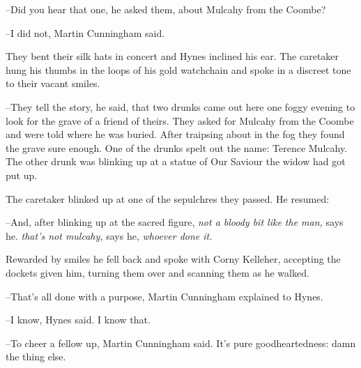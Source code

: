 --Did you hear that one,
he asked them,
about Mulcahy from the Coombe?

--I did not,
Martin Cunningham said.

They bent their silk hats in concert and Hynes inclined his ear.
The caretaker hung his thumbs in the loops of his gold watchchain
and spoke in a discreet tone to their vacant smiles.

--They tell the story,
he said,
that two drunks came out here one foggy
evening to look for the grave of a friend of theirs.
They asked for Mulcahy from the Coombe and were told where he was buried.
After traipsing about in the fog they found the grave sure enough.
One of the drunks spelt out the name:
Terence Mulcahy.
The other drunk was blinking up at a statue of Our Saviour
the widow had got put up.

The caretaker blinked up at one of the sepulchres they passed.
He resumed:

--And, after blinking up at the sacred figure,
\emph{not a bloody bit like the man,} says he.
\emph{that's not mulcahy,} says he,
\emph{whoever done it.}

Rewarded by smiles
he fell back and spoke with Corny Kelleher,
accepting the dockets given him,
turning them over and scanning them as he walked.

--That's all done with a purpose,
Martin Cunningham explained to Hynes.

--I know, Hynes said.
I know that.

--To cheer a fellow up, Martin Cunningham said.
It's pure goodheartedness:
damn the thing else.


